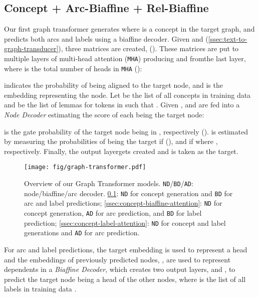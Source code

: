 \documentclass[11pt,a4paper]{article}
\newcommand{\LN}{\linebreak\noindent}    \newcommand{\textsec}[1]{\textsection\ref{#1}}
\begin{document}
\subsection{Concept + Arc-Biaffine + Rel-Biaffine}
\label{ssec:concept-biaffine}

Our first graph transformer generates  where  is a concept in the target graph, and predicts both arcs and labels using a biaffine decoder.
Given  and  (\textsec{ssec:text-to-graph-transducer}), three matrices are created,   ().
These matrices are put to multiple layers of multi-head attention (\texttt{MHA}) producing  and  from\LN the last layer, where  is the total number of heads in \texttt{MHA} ():

 indicates the probability of  being aligned to the target node, and  is the embedding representing the node.
Let  be the list of all concepts in training data and  be the list of lemmas for tokens in  such that .
Given ,  and  are fed into a \textit{Node Decoder} estimating the score of each   being the target node:

 is the gate probability of the target node being in , respectively ().
 is estimated by measuring the probabilities of  being the target if  (), and if  where , respectively.
Finally, the output layer\LN  gets created and  is taken as the target.

\begin{figure}[htbp!]
\centering
\texttt{[image: fig/graph-transformer.pdf]}
\caption{Overview of our Graph Transformer models. \texttt{ND}/\texttt{BD}/\texttt{AD}: node/biaffine/arc decoder. \textsec{ssec:concept-biaffine}: \texttt{ND} for concept generation and \texttt{BD} for arc and label predictions; \textsec{ssec:concept-biaffine-attention}: \texttt{ND} for concept generation, \texttt{AD} for arc prediction, and \texttt{BD} for label prediction; \textsec{ssec:concept-label-attention}: \texttt{ND} for concept and label generations and \texttt{AD} for arc prediction.}
\label{fig:graph-transformer}
\end{figure}

\noindent For arc and label predictions, the target embedding  is used to represent a head and the embeddings of previously predicted nodes, , are used to represent dependents in a \textit{Biaffine Decoder}, which creates two output layers,  and , to predict the target node being a head of the other nodes, where  is the list of all labels in training data \cite{dozat:17a}.
\end{document}
